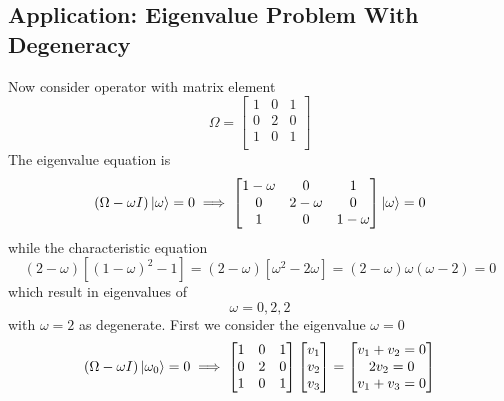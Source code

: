 \documentclass[../main.tex]{subfiles}
\begin{document}
\subsection*{Application: Eigenvalue Problem With Degeneracy}
Now consider operator with matrix element
\begin{equation*}
    \Omega=
    \begin{bmatrix}
        1&0&1\\
        0&2&0\\
        1&0&1\\
    \end{bmatrix}
\end{equation*}
The eigenvalue equation is 
\begin{equation*}
    (\Omega-\omega I)\ket{\omega}=0\implies
    \begin{bmatrix}
        1-\omega&0&1\\
        0&2-\omega&0\\
        1&0&1-\omega\\
    \end{bmatrix}
    \ket{\omega}=0
\end{equation*}
while the characteristic equation
\begin{equation*}
    (2-\omega)[(1-\omega)^2-1]=(2-\omega)[\omega^2-2\omega]=(2-\omega)\omega(\omega-2)=0
\end{equation*}
which result in eigenvalues of 
\begin{equation*}
    \omega=0,2,2
\end{equation*}
with $\omega=2$ as degenerate.
First we consider the eigenvalue $\omega=0$
\begin{equation*}
    (\Omega-\omega I)\ket{\omega_0}=0\implies
    \begin{bmatrix}
        1&0&1\\
        0&2&0\\
        1&0&1\\
    \end{bmatrix}
    \begin{bmatrix}
        v_1\\
        v_2\\
        v_3\\
    \end{bmatrix}
    =
    \begin{bmatrix}
        v_1+v_2=0\\
        2v_2=0\\
        v_1+v_3=0\\
    \end{bmatrix}
\end{equation*}
\end{document}
